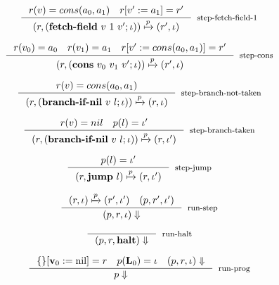 \documentclass[sigconf]{acmart}
\theoremstyle{definition}
\begin{document}
\begin{equation}
\inference{r(v) = cons(a_0,a_1)~~~r[v':=a_1]=r'}
          {(r, (\textbf{fetch-field}~v~1~v';\iota)) \xmapsto{p} (r', \iota)}[step-fetch-field-1]
\end{equation}

\begin{equation}
\inference{r(v_0) = a_0~~~r(v_1)=a_1~~~r[v':=cons(a_0,a_1)]=r'}
          {(r, (\textbf{cons}~v_0~v_1~v';\iota)) \xmapsto{p} (r', \iota)}[step-cons]
\end{equation}

\begin{equation}
\inference{r(v) = cons(a_0,a_1)}
          {(r, (\textbf{branch-if-nil}~v~l;\iota)) \xmapsto{p} (r, \iota)}[step-branch-not-taken]
\end{equation}

\begin{equation}
\inference{r(v) = nil~~~p(l)=\iota'}
          {(r, (\textbf{branch-if-nil}~v~l;\iota)) \xmapsto{p} (r, \iota')}[step-branch-taken]
\end{equation}

\begin{equation}
\inference{p(l)=\iota'}
          {(r, \textbf{jump}~l) \xmapsto{p} (r, \iota')}[step-jump]
\end{equation}

\begin{equation}
\inference{(r, \iota) \xmapsto{p} (r', \iota')~~~(p, r', \iota')}
          {(p, r, \iota) \Downarrow}[run-step]
\end{equation}

\begin{equation}
\inference{}
          {(p, r, \textbf{halt}) \Downarrow}[run-halt]
\end{equation}

\begin{equation}
\inference{\{\}[\textbf{v}_0:=\text{nil}]=r~~~p(\textbf{L}_0)=\iota~~~(p,r,\iota)\Downarrow}
          {p \Downarrow}[run-prog]
\end{equation}


\end{document}
